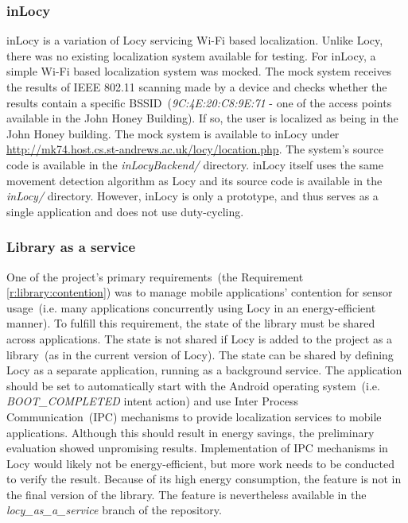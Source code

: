 
\subsubsection{inLocy}
\hspace{10pt} inLocy is a variation of Locy servicing Wi-Fi based localization. Unlike Locy, there was no existing localization system available for testing. For inLocy, a simple Wi-Fi based localization system was mocked. The mock system receives the results of IEEE 802.11 scanning made by a device and checks whether the results contain a specific BSSID\ (\textit{9C:4E:20:C8:9E:71} - one of the access points available in the John Honey Building). If so, the user is localized as being in the John Honey building. The mock system is available to inLocy under \url{http://mk74.host.cs.st-andrews.ac.uk/locy/location.php}. The system's source code is available in the \textit{inLocyBackend/} directory. inLocy itself uses the same movement detection algorithm as Locy and its source code is available in the \textit{inLocy/} directory. However, inLocy is only a prototype, and thus serves as a single application and does not use duty-cycling. 

\subsubsection{Library as a service}
\hspace{10pt} One of the project's primary requirements\ (the Requirement \ref{r:library:contention}) was to manage mobile applications' contention for sensor usage\ (i.e. many applications concurrently using Locy in an energy-efficient manner). To fulfill this requirement, the state of the library must be shared across applications. The state is not shared if Locy is added to the project as a library\ (as in the current version of Locy). The state can be shared by defining Locy as a separate application, running as a background service. The application should be set to automatically start with the Android operating system\ (i.e. \textit{BOOT\_COMPLETED} intent action) and use Inter Process Communication\ (IPC) mechanisms to provide localization services to mobile applications. Although this should result in energy savings, the preliminary evaluation showed unpromising results. Implementation of IPC mechanisms in Locy would likely not be energy-efficient, but more work needs to be conducted to verify the result. Because of its high energy consumption, the feature is not in the final version of the library. The feature is nevertheless available in the \textit{locy\_as\_a\_service} branch of the repository.

